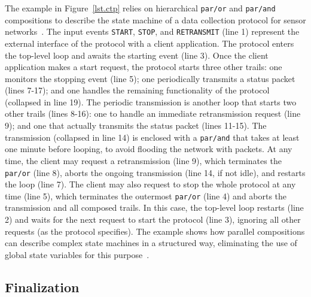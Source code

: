 \documentclass{sigplanconf}
\newcommand{\code}[1] {{\small{\texttt{#1}}}}
\newcommand{\1}{\;}
\newcommand{\2}{\;\;}
\newcommand{\3}{\;\;\;}
\newcommand{\5}{\;\;\;\;\;}
\begin{document}
The example in Figure~\ref{lst.ctp} relies on hierarchical \code{par/or} and 
\code{par/and} compositions to describe the state machine of a data collection 
protocol for sensor networks~\cite{wsn.ctp,ceu.sensys13}.
%
The input events \code{START}, \code{STOP}, and \code{RETRANSMIT} (line 1) 
represent the external interface of the protocol with a client application.
%
The protocol enters the top-level loop and awaits the starting event (line 3).
Once the client application makes a start request, the protocol starts three 
other trails:
one monitors the stopping event (line 5);
one periodically transmits a status packet (lines 7-17);
and one handles the remaining functionality of the protocol (collapsed in line 
19).
%
The periodic transmission is another loop that starts two other trails (lines 
8-16):
one to handle an immediate retransmission request (line 9);
and one that actually transmits the status packet (lines 11-15).
%
The transmission (collapsed in line 14) is enclosed with a \code{par/and} that 
takes at least one minute before looping, to avoid flooding the network with 
packets.
%
At any time, the client may request a retransmission (line 9), which terminates 
the \code{par/or} (line 8), aborts the ongoing transmission (line 14, if not 
idle), and restarts the loop (line 7).
%
The client may also request to stop the whole protocol at any time (line 5), 
which terminates the outermost \code{par/or} (line 4) and aborts the 
transmission and all composed trails.
In this case, the top-level loop restarts (line 2) and waits for the next 
request to start the protocol (line 3), ignoring all other requests (as the 
protocol specifies).
%
The example shows how parallel compositions can describe complex state machines 
in a structured way, eliminating the use of global state variables for this 
purpose~\cite{ceu.sensys13}.

\subsection{Finalization}
\label{sec.ceu.fin}

\end{document}
